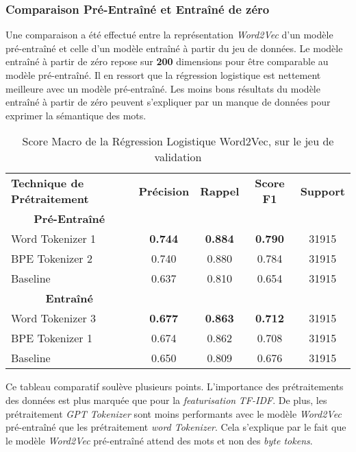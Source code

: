 \subsubsection{Comparaison Pré-Entraîné et Entraîné de zéro}
Une comparaison a été effectué entre la représentation \textit{Word2Vec} d'un modèle pré-entraîné et celle d'un modèle entraîné à partir du jeu de données. 
Le modèle entraîné à partir de zéro repose sur \textbf{200} dimensions pour être comparable au modèle pré-entraîné. 
Il en ressort que la régression logistique est nettement meilleure avec un modèle pré-entraîné. Les moins bons résultats du modèle entraîné à partir de zéro peuvent s'expliquer par un manque de données pour exprimer la sémantique des mots.
\begin{table}[ht]
    \centering
    \caption{Score Macro de la Régression Logistique Word2Vec, sur le jeu de validation}
    \begin{tabular}{lcccc}
    \hline
    \textbf{Technique de Prétraitement} & \textbf{Précision} & \textbf{Rappel} & \textbf{Score F1} & \textbf{Support}  \\
    \multicolumn{1}{c}{\textbf{Pré-Entraîné}} \\
    Word Tokenizer 1             & \textbf{0.744}              & \textbf{0.884}           & \textbf{0.790}            & 31915            \\
    BPE Tokenizer 2              & 0.740              & 0.880           & 0.784            & 31915            \\ \hline 
    Baseline                     & 0.637              & 0.810           & 0.654            & 31915            \\
    \hline \multicolumn{1}{c}{\textbf{Entraîné}} \\
    Word Tokenizer 3             & \textbf{0.677}              & \textbf{0.863}           & \textbf{0.712}            & 31915            \\
    BPE Tokenizer 1              & 0.674              & 0.862           & 0.708            & 31915            \\ \hline
    Baseline               & 0.650              & 0.809           & 0.676            & 31915            \\ 
    \hline \end{tabular}
    \label{tab:results}
\end{table}

Ce tableau comparatif soulève plusieurs points.
L'importance des prétraitements des données est plus marquée que pour la \textit{featurisation} \textit{TF-IDF}. 
De plus, les prétraitement \textit{GPT Tokenizer} sont moins performants avec le modèle \textit{Word2Vec} pré-entraîné que les prétraitement \textit{word Tokenizer}. 
Cela s'explique par le fait que le modèle \textit{Word2Vec} pré-entraîné attend des mots et non des \textit{byte tokens}.
